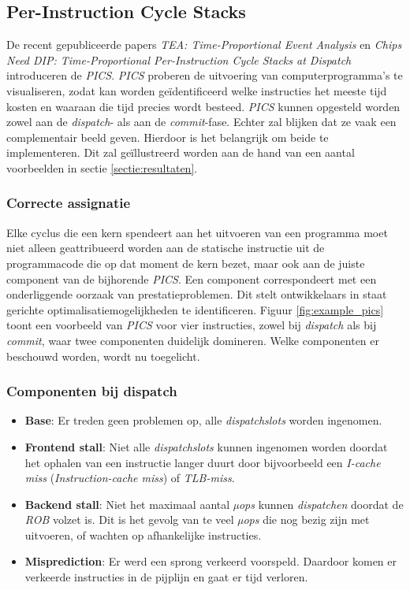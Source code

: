 \documentclass[12pt,a4paper,faculty=ea,language=nl]{ugent-doc}
\begin{document}
\subsection{Per-Instruction Cycle Stacks}
De recent gepubliceerde papers \textit{TEA: Time-Proportional Event Analysis} \cite{tea2023} en \textit{Chips Need DIP: Time-Proportional Per-Instruction Cycle Stacks at Dispatch} \cite{dip2026} introduceren de \textit{PICS}. \textit{PICS} proberen de uitvoering van computerprogramma's te visualiseren, zodat kan worden geïdentificeerd welke instructies het meeste tijd kosten en waaraan die tijd precies wordt besteed. \textit{PICS} kunnen opgesteld worden zowel aan de \textit{dispatch}- als aan de \textit{commit}-fase. Echter zal blijken dat ze vaak een complementair beeld geven. Hierdoor is het belangrijk om beide te implementeren. Dit zal geïllustreerd worden aan de hand van een aantal voorbeelden in sectie \ref{sectie:resultaten}.

\subsubsection{Correcte assignatie}
Elke cyclus die een kern spendeert aan het uitvoeren van een programma moet niet alleen geattribueerd worden aan de statische instructie uit de programmacode die op dat moment de kern bezet, maar ook aan de juiste component van de bijhorende \textit{PICS}. Een component correspondeert met een onderliggende oorzaak van prestatieproblemen. Dit stelt ontwikkelaars in staat gerichte optimalisatiemogelijkheden te identificeren. Figuur \ref{fig:example_pics} toont een voorbeeld van \textit{PICS} voor vier instructies, zowel bij \textit{dispatch} als bij \textit{commit}, waar twee componenten duidelijk domineren. Welke componenten er beschouwd worden, wordt nu toegelicht.


\subsubsection{Componenten bij dispatch}
\label{subsubsection:dispatch toestanden}
\begin{itemize}
    \item \textbf{Base}: Er treden geen problemen op, alle \textit{dispatchslots} worden ingenomen.

    \item \textbf{Frontend stall}: Niet alle \textit{dispatchslots} kunnen ingenomen worden doordat het ophalen van een instructie langer duurt door bijvoorbeeld een \textit{I-cache miss} (\textit{Instruction-cache miss}) of \textit{TLB-miss}.

    \item \textbf{Backend stall}: Niet het maximaal aantal \textit{µops} kunnen \textit{dispatchen} doordat de \textit{ROB} volzet is. Dit is het gevolg van te veel \textit{µops} die nog bezig zijn met uitvoeren, of wachten op afhankelijke instructies.

    \item \textbf{Misprediction}: Er werd een sprong verkeerd voorspeld. Daardoor komen er verkeerde instructies in de pijplijn en gaat er tijd verloren.
\end{itemize}
\end{document}
